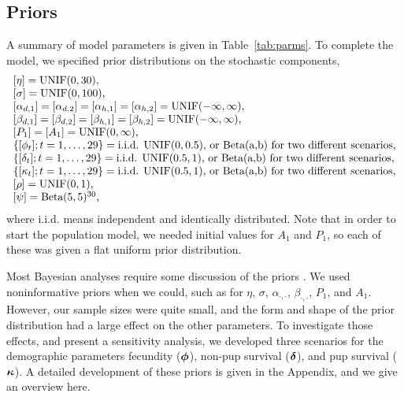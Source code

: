 \documentclass[12pt, titlepage]{article}\usepackage[]{graphicx}\usepackage[]{color}
\def\bdelta{\mbox{\boldmath $\delta$}}
\def\bphi{\mbox{\boldmath $\phi$}}
\def\bkappa{\mbox{\boldmath $\kappa$}}
\begin{document}

\subsection{Priors} \label{sec:priors}
A summary of model parameters is given in Table~\ref{tab:parms}. To complete the model, we specified prior distributions on the stochastic components,
%
\[
  \begin{tabular}{l}
    $[\eta] = \textrm{UNIF}(0,30)$, \\
    $[\sigma] = \textrm{UNIF}(0,100)$, \\
    $[\alpha_{d,1}] = [\alpha_{d,2}] = [\alpha_{h,1}] = [\alpha_{h,2}] = \textrm{UNIF}(-\infty,\infty)$, \\
    $[\beta_{d,1}] = [\beta_{d,2}] = [\beta_{h,1}] = [\beta_{h,2}] = \textrm{UNIF}(-\infty,\infty)$, \\
    $[P_1] = [A_1] = \textrm{UNIF}(0,\infty)$, \\
    $\{[\phi_t]; t= 1,\ldots,29\} = \textrm{i.i.d. UNIF}(0,0.5)$, or Beta(a,b) for two different scenarios,\\
    $\{[\delta_t]; t= 1,\ldots,29\} = \textrm{i.i.d. UNIF}(0.5,1)$, or Beta(a,b) for two different scenarios,\\
    $\{[\kappa_t]; t= 1,\ldots,29\} = \textrm{i.i.d. UNIF}(0.5,1)$, or Beta(a,b) for two different scenarios, \\
		$[\rho] = \textrm{UNIF}(0,1)$, \\
    $[\psi] = \textrm{Beta}(5,5)^{30}$,
  \end{tabular} 
\]
where i.i.d. means independent and identically distributed. Note that in order to start the population model, we needed initial values for $A_1$ and $P_1$, so each of these was given a flat uniform prior distribution.

Most Bayesian analyses require some discussion of the priors \citep{Good:take:2010}.  We used noninformative priors when we could, such as for $\eta$, $\sigma$, $\alpha_{\cdot,\cdot}$, $\beta_{\cdot,\cdot}$, $P_1$, and $A_1$.  However, our sample sizes were quite small, and the form and shape of the prior distribution had a large effect on the other parameters.  To investigate those effects, and present a sensitivity analysis, we developed three scenarios for the demographic parameters fecundity ($\bphi$), non-pup survival ($\bdelta$), and pup survival ($\bkappa$).  A detailed development of these priors is given in the Appendix, and we give an overview here.  
\end{document}
